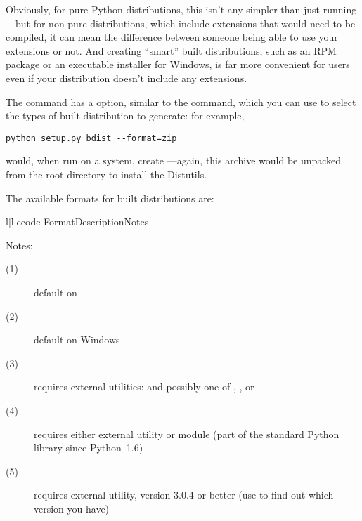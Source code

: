 \documentclass{howto}
\begin{document}
Obviously, for pure Python distributions, this isn't any simpler than
just running ---but for non-pure
distributions, which include extensions that would need to be
compiled, it can mean the difference between someone being able to use
your extensions or not.  And creating ``smart'' built distributions,
such as an RPM package or an executable installer for Windows, is far
more convenient for users even if your distribution doesn't include
any extensions.

The  command has a  option,
similar to the  command, which you can use to select the
types of built distribution to generate: for example,

\begin{verbatim}
python setup.py bdist --format=zip
\end{verbatim}

would, when run on a \UNIX{} system, create
---again, this archive would be
unpacked from the root directory to install the Distutils.

The available formats for built distributions are:
\begin{tableiii}{l|l|c}{code}%
  {Format}{Description}{Notes}
\end{tableiii}

\noindent Notes:
\begin{description}
\item[(1)] default on \UNIX
\item[(2)] default on Windows 
\item[(3)] requires external utilities:  and possibly one
  of , , or 
\item[(4)] requires either external  utility or
   module (part of the standard Python library since
  Python~1.6)
\item[(5)] requires external  utility, version 3.0.4 or
  better (use  to find out which version you have)
\end{description}
\end{document}

